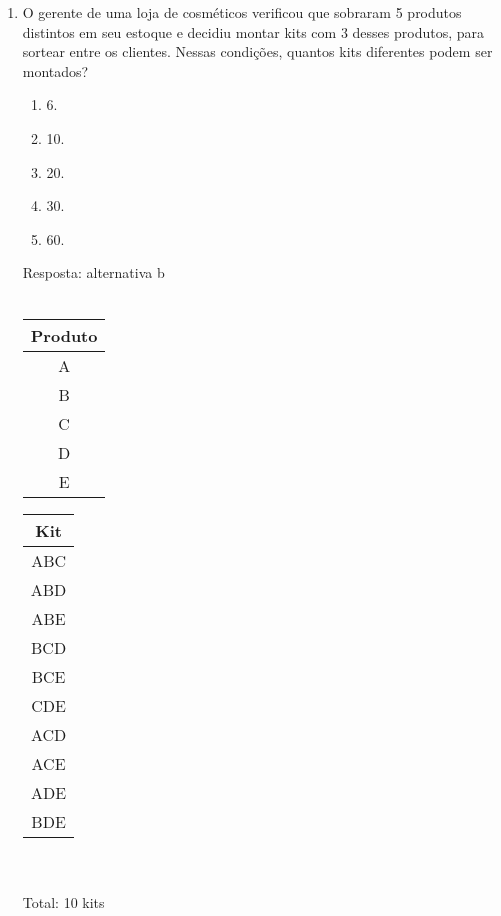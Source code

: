 \documentclass[a4paper,14pt]{article}
\begin{document}
\begin{enumerate}
        \item O gerente de uma loja de cosméticos verificou que sobraram 5 produtos distintos em seu estoque e
        decidiu montar kits com 3 desses produtos, para sortear entre os clientes.
        Nessas condições, quantos kits diferentes podem ser montados?
        \begin{enumerate}
        	\item 6.
        	\item 10.
        	\item 20.
        	\item 30.
        	\item 60.
        \end{enumerate}
        Resposta: alternativa b \\ \\
        \begin{tabular}{c}
        	\toprule
        	\textbf{Produto}  \\
        	\midrule
        	A  \\
        	B  \\
        	C  \\
        	D  \\
        	E  \\
        	\bottomrule
        \end{tabular}
    	\newline
        \begin{tabular}{c}
        	\toprule
        	\textbf{Kit}  \\
        	\midrule
        	ABC  \\
        	ABD  \\
        	ABE \\
        	BCD  \\
        	BCE  \\
        	CDE \\
        	ACD \\
        	ACE \\
        	ADE \\
        	BDE \\
        	\bottomrule
        \end{tabular}
        \\
    	\\ Total: 10 kits
        \vspace{0cm}
        

\end{enumerate}
\end{document}
